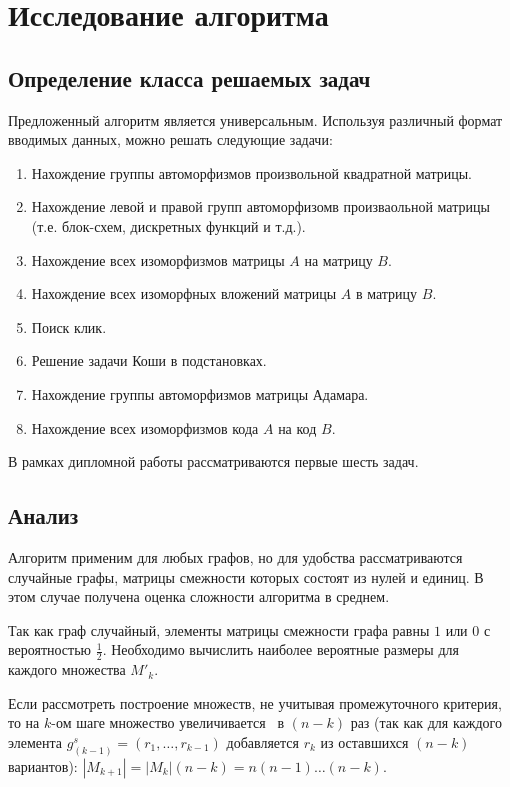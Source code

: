 \section{Исследование алгоритма}
\label{sec:AlgoResearch_4} 
\large


\subsection{Определение класса решаемых задач}
Предложенный алгоритм является универсальным. Используя различный формат вводимых данных, можно решать следующие задачи:
\begin{enumerate}
\item Нахождение группы автоморфизмов произвольной квадратной матрицы.
\item Нахождение левой и правой групп автоморфизомв произваольной матрицы (т.е. блок-схем, дискретных функций и т.д.).
\item Нахождение всех изоморфизмов матрицы $A$ на матрицу $B$.
\item Нахождение всех изоморфных вложений матрицы $A$ в матрицу $B$.
\item Поиск клик.
\item Решение задачи Коши в подстановках.
\item Нахождение группы автоморфизмов матрицы Адамара.
\item Нахождение всех изоморфизмов кода $A$ на код $B$.
\end{enumerate}

В рамках дипломной работы рассматриваются первые шесть задач.

\subsection{Анализ}

Алгоритм применим для любых графов, но для удобства рассматриваются случайные графы, матрицы смежности которых состоят из нулей и единиц.
В этом случае получена оценка сложности алгоритма в среднем.

Так как граф случайный, элементы матрицы смежности графа равны $1$ или $0$ с вероятностью $\frac{1}{2}$. Необходимо вычислить наиболее вероятные размеры для каждого множества $M'_k$.

Если рассмотреть построение множеств, не учитывая промежуточного критерия, то на $k$-ом шаге множество увеличивается \ в $(n-k)$ раз (так как для каждого элемента $g^s_{(k-1)} = (r_1, \ldots, r_{k-1})$ добавляется $r_k$ из оставшихся $(n-k)$ вариантов): $|M_{k+1}| = |M_{k}|(n-k)= n(n-1)\ldots(n-k)$.

